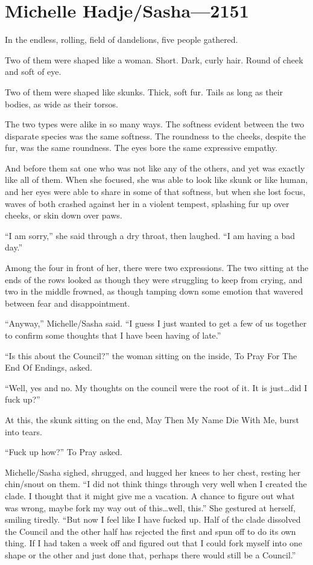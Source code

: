 \hypertarget{michelle-hadjesasha-2151}{%
\chapter{Michelle Hadje/Sasha---2151}\label{michelle-hadjesasha-2151}}

In the endless, rolling, field of dandelions, five people gathered.

Two of them were shaped like a woman. Short. Dark, curly hair. Round of cheek and soft of eye.

Two of them were shaped like skunks. Thick, soft fur. Tails as long as their bodies, as wide as their torsos.

The two types were alike in so many ways. The softness evident between the two disparate species was the same softness. The roundness to the cheeks, despite the fur, was the same roundness. The eyes bore the same expressive empathy.

And before them sat one who was not like any of the others, and yet was exactly like all of them. When she focused, she was able to look like skunk or like human, and her eyes were able to share in some of that softness, but when she lost focus, waves of both crashed against her in a violent tempest, splashing fur up over cheeks, or skin down over paws.

``I am sorry,'' she said through a dry throat, then laughed. ``I am having a bad day.''

Among the four in front of her, there were two expressions. The two sitting at the ends of the rows looked as though they were struggling to keep from crying, and two in the middle frowned, as though tamping down some emotion that wavered between fear and disappointment.

``Anyway,'' Michelle/Sasha said. ``I guess I just wanted to get a few of us together to confirm some thoughts that I have been having of late.''

``Is this about the Council?'' the woman sitting on the inside, To Pray For The End Of Endings, asked.

``Well, yes and no. My thoughts on the council were the root of it. It is just\ldots did I fuck up?''

At this, the skunk sitting on the end, May Then My Name Die With Me, burst into tears.

``Fuck up how?'' To Pray asked.

Michelle/Sasha sighed, shrugged, and hugged her knees to her chest, resting her chin/snout on them. ``I did not think things through very well when I created the clade. I thought that it might give me a vacation. A chance to figure out what was wrong, maybe fork my way out of this\ldots well, this.'' She gestured at herself, smiling tiredly. ``But now I feel like I have fucked up. Half of the clade dissolved the Council and the other half has rejected the first and spun off to do its own thing. If I had taken a week off and figured out that I could fork myself into one shape or the other and just done that, perhaps there would still be a Council.''


